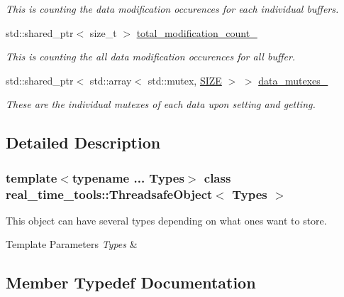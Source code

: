 \begin{DoxyCompactItemize}
\begin{DoxyCompactList}\small\item\em This is counting the data modification occurences for each individual buffers. \end{DoxyCompactList}\item 
std\+::shared\+\_\+ptr$<$ size\+\_\+t $>$ \hyperlink{classreal__time__tools_1_1ThreadsafeObject_a12f866f5a2f955aa3b55b03623033fca}{total\+\_\+modification\+\_\+count\+\_\+}
\begin{DoxyCompactList}\small\item\em This is counting the all data modification occurences for all buffer. \end{DoxyCompactList}\item 
\mbox{\label{classreal__time__tools_1_1ThreadsafeObject_a8a4e122257d25cf42a389c56daf41cb7}} 
std\+::shared\+\_\+ptr$<$ std\+::array$<$ std\+::mutex, \hyperlink{classreal__time__tools_1_1ThreadsafeObject_af05c02b66f0b75ea12cde9274bc2a97d}{S\+I\+ZE} $>$ $>$ \hyperlink{classreal__time__tools_1_1ThreadsafeObject_a8a4e122257d25cf42a389c56daf41cb7}{data\+\_\+mutexes\+\_\+}
\begin{DoxyCompactList}\small\item\em These are the individual mutexes of each data upon setting and getting. \end{DoxyCompactList}\end{DoxyCompactItemize}


\subsection{Detailed Description}
\subsubsection*{template$<$typename ... Types$>$\newline
class real\+\_\+time\+\_\+tools\+::\+Threadsafe\+Object$<$ Types $>$}

This object can have several types depending on what ones want to store. 


\begin{DoxyTemplParams}{Template Parameters}
{\em Types} & \\
\hline
\end{DoxyTemplParams}


\subsection{Member Typedef Documentation}
\mbox{\label{classreal__time__tools_1_1ThreadsafeObject_afcbd77df1964d4fe606f1e776f1ff9b8}} 
